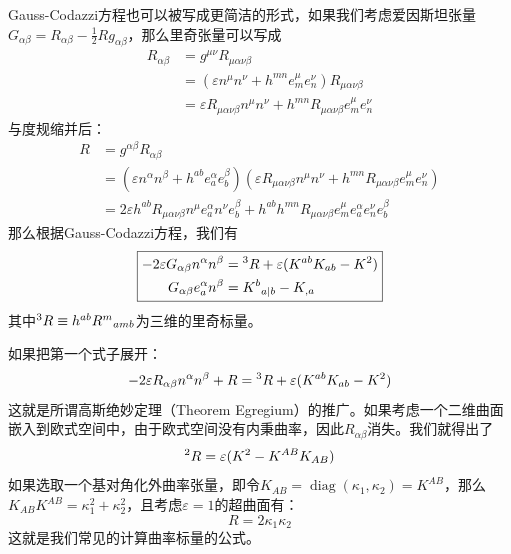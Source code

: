\documentclass[hyperref, UTF8, a4paper]{ctexart}
\begin{document}
Gauss-Codazzi方程也可以被写成更简洁的形式，如果我们考虑爱因斯坦张量$G_{\alpha \beta } =R_{\alpha \beta } -\frac{1}{2} Rg_{\alpha \beta }$，那么里奇张量可以写成
\begin{equation*}
	\begin{aligned}
		R_{\alpha \beta } & =g^{\mu \nu } R_{\mu \alpha \nu \beta }\\
		& =(\varepsilon n^{\mu } n^{\nu } +h^{mn} e_{m}^{\mu } e_{n}^{\nu } )R_{\mu \alpha \nu \beta }\\
		& =\varepsilon R_{\mu \alpha \nu \beta } n^{\mu } n^{\nu } +h^{mn} R_{\mu \alpha \nu \beta } e_{m}^{\mu } e_{n}^{\nu }
	\end{aligned}
\end{equation*}
与度规缩并后：
\begin{equation}
	\begin{aligned}
		R & =g^{\alpha \beta } R_{\alpha \beta }\\
		& =(\varepsilon n^{\alpha } n^{\beta } +h^{ab} e_{a}^{\alpha } e_{b}^{\beta } )(\varepsilon R_{\mu \alpha \nu \beta } n^{\mu } n^{\nu } +h^{mn} R_{\mu \alpha \nu \beta } e_{m}^{\mu } e_{n}^{\nu } )\\
		& =2\varepsilon h^{ab} R_{\mu \alpha \nu \beta } n^{\mu } e_{a}^{\alpha } n^{\nu } e_{b}^{\beta } +h^{ab} h^{mn} R_{\mu \alpha \nu \beta } e_{m}^{\mu } e_{a}^{\alpha } e_{n}^{\nu } e_{b}^{\beta }
	\end{aligned}
	\label{ricci scalar expended}
\end{equation}
那么根据Gauss-Codazzi方程，我们有
\begin{equation*}
	\boxed{\begin{aligned}
			-2\varepsilon G_{\alpha \beta } n^{\alpha } n^{\beta } & =\prescript{3}{}{} R+\varepsilon (K^{ab} K_{ab} -K^{2} )\\
			G_{\alpha \beta } e_{a}^{\alpha } n^{\beta } & =K^{b}{}_{a|b} -K_{,a}
	\end{aligned}}
\end{equation*}
其中$\prescript{3}{}{} R\equiv h^{ab} R^{m}{}_{amb}$为三维的里奇标量。

如果把第一个式子展开：
\begin{equation*}
	-2\varepsilon R_{\alpha \beta } n^{\alpha } n^{\beta } +R=\prescript{3}{}{} R+\varepsilon (K^{ab} K_{ab} -K^{2} )
\end{equation*}
这就是所谓高斯绝妙定理（Theorem Egregium）的推广。如果考虑一个二维曲面嵌入到欧式空间中，由于欧式空间没有内秉曲率，因此$R_{\alpha \beta }$消失。我们就得出了
\begin{equation*}
	\prescript{2}{}{} R=\varepsilon (K^{2} -K^{AB} K_{AB} )
\end{equation*}
如果选取一个基对角化外曲率张量，即令$K_{AB} =\operatorname{diag}( \kappa _{1} ,\kappa _{2}) =K^{AB}$，那么$K_{AB} K^{AB} =\kappa _{1}^{2} +\kappa _{2}^{2}$，且考虑$\varepsilon =1$的超曲面有：
\begin{equation*}
	R=2\kappa _{1} \kappa _{2}
\end{equation*}
这就是我们常见的计算曲率标量的公式。
\end{document}

